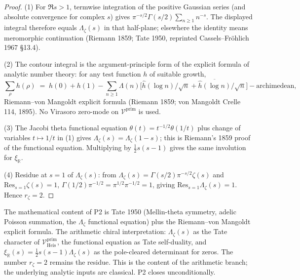 \begin{proof}
(1) For \(\Re s>1\), termwise integration of the positive Gaussian
series (and absolute convergence for complex \(s\)) gives
\(\pi^{-s/2}\Gamma(s/2)\sum_{n\ge1}n^{-s}\).
The displayed integral therefore equals \(\Lambda_\zeta(s)\) in that
half-plane; elsewhere the identity means meromorphic continuation
(Riemann 1859; Tate 1950, reprinted Cassels--Fr\"ohlich 1967 \S13.4).

(2) The contour integral is the argument-principle form of the
explicit formula of analytic number theory: for any test function \(h\) of
suitable growth,
\begin{equation}
\sum_{\rho}h(\rho)\;=\;h(0)+h(1)-\sum_{n\geq 1}\Lambda(n)\bigl[\widehat{h}(\log n)/\sqrt{n}+\overline{\widehat{h}(\log n)}/\sqrt{n}\bigr]-\text{archimedean},
\end{equation}
Riemann--von Mangoldt explicit formula (Riemann 1859; von Mangoldt
Crelle 114, 1895). No Virasoro zero-mode on
\(\mathcal{V}^{\mathrm{prim}}\) is used.

(3) The Jacobi theta functional equation \(\theta(t)=t^{-1/2}\theta(1/t)\)
plus change of variables \(t\mapsto 1/t\) in (1) gives
\(\Lambda_{\zeta}(s)=\Lambda_{\zeta}(1-s)\);
this is Riemann's 1859 proof of the functional equation. Multiplying
by \(\tfrac12s(s-1)\) gives the same involution
for \(\xi_{\mathbb R}\).

(4) Residue at \(s=1\) of \(\Lambda_{\zeta}(s)\): from \(\Lambda_{\zeta}(s)=\Gamma(s/2)\pi^{-s/2}\zeta(s)\)
and \(\mathrm{Res}_{s=1}\zeta(s)=1\), \(\Gamma(1/2)\pi^{-1/2}=\pi^{1/2}\pi^{-1/2}=1\),
giving \(\mathrm{Res}_{s=1}\Lambda_{\zeta}(s)=1\). Hence \(r_{\zeta}=2\).
\end{proof}

\begin{remark}
\label{v4-arith:cl:rem:P2-is-Tate}
The mathematical content of P2 is Tate 1950 (Mellin-theta symmetry,
adelic Poisson summation, the \(\Lambda_{\zeta}\) functional equation) plus the
Riemann--von Mangoldt explicit formula. The arithmetic chiral
interpretation: \(\Lambda_{\zeta}(s)\) as the Tate character of
\(\mathcal{V}^{\mathrm{prim}}_{\mathrm{Heis}}\), the functional equation
as Tate self-duality, and
\(\xi_{\mathbb R}(s)=\tfrac12s(s-1)\Lambda_{\zeta}(s)\) as the
pole-cleared determinant for zeros. The number \(r_{\zeta}=2\) remains
the residue. This
is the content of the arithmetic branch; the underlying analytic inputs
are classical. P2 closes unconditionally.
\end{remark}

